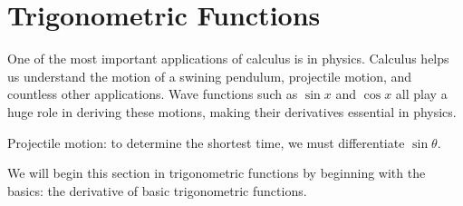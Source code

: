 \documentclass[working]{tuftebook}
\begin{document}
\chapter{Trigonometric Functions}
\vspace{-2em}
One of the most important applications of calculus is in physics. Calculus helps us understand the motion of a swining pendulum, projectile motion, and countless other applications. Wave functions such as $ \sin x$ and $ \cos x$ all play a huge role in deriving these motions, making their derivatives essential in physics. 

\begin{marginfigure}
    \centering
    \caption{Projectile motion: to determine the shortest time, we must differentiate $ \sin \theta$.}
    \label{fig:projectile-motion}
\end{marginfigure}

We will begin this section in trigonometric functions by beginning with the basics: the derivative of basic trigonometric functions. 
\end{document}
